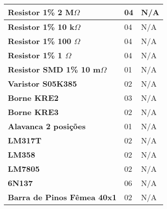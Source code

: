 \begin{table}[!ht]
\begin{tabular}{|l|l|l|}
        \textbf{Resistor 1\% 2 M$\Omega$}      & 04                  & N/A                    \\ \hline
        \textbf{Resistor 1\% 10 k$\Omega$}     & 04                  & N/A                    \\ \hline
        \textbf{Resistor 1\% 100 $\Omega$}     & 04                  & N/A                    \\ \hline
        \textbf{Resistor 1\% 1 $\Omega$}       & 04                  & N/A                    \\ \hline
        \textbf{Resistor SMD 1\% 10 m$\Omega$} & 01                  & N/A                    \\ \hline
        \textbf{Varistor S05K385}              & 02                  & N/A                    \\ \hline
        \textbf{Borne KRE2}                    & 03                  & N/A                    \\ \hline
        \textbf{Borne KRE3}                    & 02                  & N/A                    \\ \hline
        \textbf{Alavanca 2 posições}           & 01                  & N/A                    \\ \hline
        \textbf{LM317T}                        & 02                  & N/A                    \\ \hline
        \textbf{LM358}                         & 02                  & N/A                    \\ \hline
        \textbf{LM7805}                        & 02                  & N/A                    \\ \hline
        \textbf{6N137}                         & 06                  & N/A                    \\ \hline
        \textbf{Barra de Pinos Fêmea 40x1}     & 02                  & N/A                    \\ \hline
    \end{tabular}
\end{table}